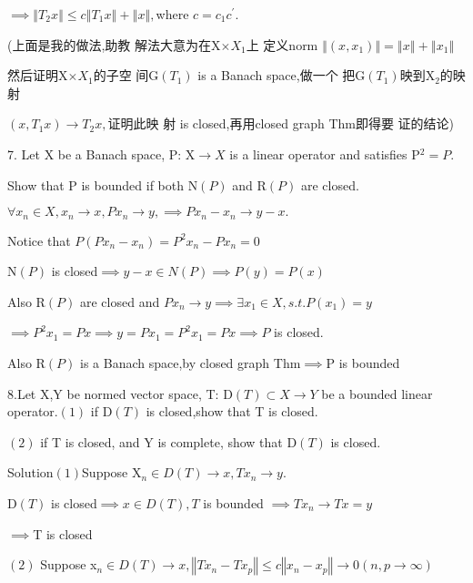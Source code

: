\documentclass{article}
\begin{document}
\begin{CJK}{GBK}{song}
$\implies \left\Vert T_{2}x\right\Vert \leq c\left\Vert T_{1}x\right\Vert
+\left\Vert x\right\Vert ,$where $c=c_{1}c^{\prime }.$

(上面是我的做法,助教%
解法大意为在X$\times X_{1}$上%
定义norm $\left\Vert \left( x,x_{1}\right) \right\Vert
=\left\Vert x\right\Vert +\left\Vert x_{1}\right\Vert $

然后证明X$\times X_{1}$的子空%
间G$\left( T_{1}\right) $ is a Banach space,做一个%
把G$\left( T_{1}\right) $映到X$_{2}$的映%
射

$\left( x,T_{1}x\right) \rightarrow T_{2}x,$证明此映%
射 is closed,再用closed graph Thm即得要%
证的结论)

7. Let X be a Banach space, P: X$\rightarrow X$ is a linear operator and
satisfies P$^{2}=P.$

Show that P is bounded if both N$\left( P\right) $ and R$\left( P\right) $
are closed.

$\forall x_{n}\in X,x_{n}\rightarrow x,Px_{n}\rightarrow y,\implies
Px_{n}-x_{n}\rightarrow y-x.$

Notice that $P\left( Px_{n}-x_{n}\right) =P^{2}x_{n}-Px_{n}=0$

N$\left( P\right) $ is closed$\implies y-x\in N\left( P\right) \implies
P\left( y\right) =P\left( x\right) $

Also R$\left( P\right) $ are closed and $Px_{n}\rightarrow y\implies \exists
x_{1}\in X,s.t.P\left( x_{1}\right) =y$

$\implies P^{2}x_{1}=Px\implies y=Px_{1}=P^{2}x_{1}=Px\implies P$ is closed.

Also R$\left( P\right) $ is a Banach space,by closed graph Thm$\implies $P
is bounded

8.Let X,Y be normed vector space, T: D$\left( T\right) \subset X\rightarrow
Y $ be a bounded linear operator.$\left( 1\right) $ if D$\left( T\right) $
is closed,show that T is closed.

$\left( 2\right) $ if T is closed, and Y is complete, show that D$\left(
T\right) $ is closed.

Solution$\left( 1\right) $Suppose X$_{n}\in D\left( T\right) \rightarrow
x,Tx_{n}\rightarrow y.$

D$\left( T\right) $ is closed$\implies x\in D\left( T\right) ,T$ is bounded $%
\implies Tx_{n}\rightarrow Tx=y$

$\implies $T is closed

$\left( 2\right) $ Suppose x$_{n}\in D\left( T\right) \rightarrow
x,\left\Vert Tx_{n}-Tx_{p}\right\Vert \leq c\left\Vert
x_{n}-x_{p}\right\Vert \rightarrow 0\left( n,p\rightarrow \infty \right) $


\end{CJK}
\end{document}
